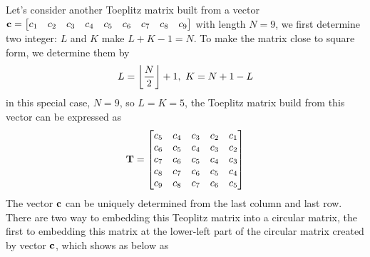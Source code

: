\documentclass[revised,endfloat]{geophysics}
\DeclarePairedDelimiter\floor{\lfloor}{\rfloor}
\begin{document}
Let's consider another Toeplitz matrix built from a vector ${\bf c} = \begin{bmatrix}
c_1 & c_2 & c_3 & c_4 & c_5 & c_6 & c_7 & c_8 & c_9 \end{bmatrix}$ with length $N=9$, we first determine two integer: $L$ and $K$ make $L+K-1= N $. To make the matrix close to square form, we determine them by
\begin{equation}
L = \floor*{\frac{N}{2}}+1 ,\,\, K = N+1-L
\label{eq11}
\end{equation}
in this special case, $N=9$, so $L=K=5$, the Toeplitz matrix build from this vector can be expressed as
\begin{equation}
{\bf T} = 
\begin{bmatrix}
c_5 & c_4 & c_3 & c_2 & c_1 \\ 
c_6 & c_5 & c_4 & c_3 & c_2 \\ 
c_7 & c_6 & c_5 & c_4 & c_3 \\ 
c_8 & c_7 & c_6 & c_5 & c_4 \\ 
c_9 & c_8 & c_7 & c_6 & c_5 \\ 
\end{bmatrix}
\label{eq12}
\end{equation} 
The vector ${\bf c}$ can be uniquely determined from the last column and last row. 
There are two way to embedding this Teoplitz matrix into a circular matrix, the first to embedding this matrix at the lower-left part of the circular matrix created by vector ${\bf c}$, which shows as below as
\begin{center}
\end{center}
\end{document}
